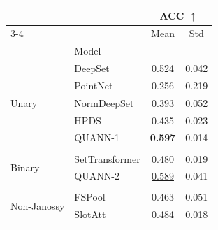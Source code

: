 \begin{tabular}{llcc}
\toprule
& & \multicolumn{2}{c}{ACC $\uparrow$} \\
 \cmidrule(r){3-4}
 &  & Mean & Std \\
 & Model &  &  \\
\midrule
\multirow[t]{5}{*}{Unary} & DeepSet & 0.524 & 0.042 \\
 & PointNet & 0.256 & 0.219 \\
 & NormDeepSet & 0.393 & 0.052 \\
 & HPDS & 0.435 & 0.023 \\
 & QUANN-1 & \textbf{0.597} & 0.014 \\
\vspace{2\baselineskip}\\
\multirow[t]{2}{*}{Binary} & SetTransformer & 0.480 & 0.019 \\
 & QUANN-2 & \underline{0.589} & 0.041 \\
\vspace{2\baselineskip}\\
\multirow[t]{2}{*}{Non-Janossy} & FSPool & 0.463 & 0.051 \\
 & SlotAtt & 0.484 & 0.018 \\
\bottomrule
\end{tabular}